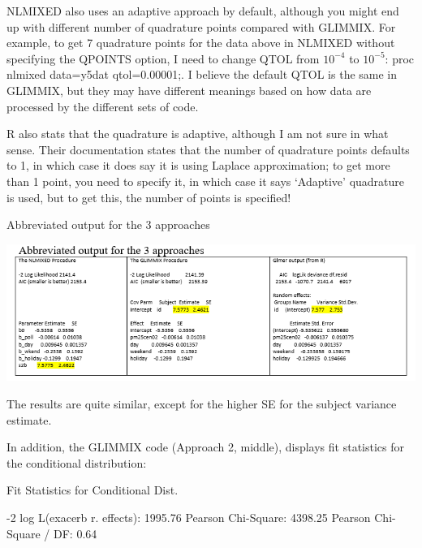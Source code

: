 \documentclass[
  9pt,
  ignorenonframetext,
]{beamer}
\begin{document}
\begin{frame}{}
\protect\hypertarget{section-4}{}
NLMIXED also uses an adaptive approach by default, although you might
end up with different number of quadrature points compared with GLIMMIX.
For example, to get 7 quadrature points for the data above in NLMIXED
without specifying the QPOINTS option, I need to change QTOL from
\(10^{-4}\) to \(10^{-5}\): proc nlmixed data=y5dat qtol=0.00001;. I
believe the default QTOL is the same in GLIMMIX, but they may have
different meanings based on how data are processed by the different sets
of code.

R also stats that the quadrature is adaptive, although I am not sure in
what sense. Their documentation states that the number of quadrature
points defaults to 1, in which case it does say it is using Laplace
approximation; to get more than 1 point, you need to specify it, in
which case it says `Adaptive' quadrature is used, but to get this, the
number of points is specified!
\end{frame}

\begin{frame}{Abbreviated output for the 3 approaches}
\protect\hypertarget{abbreviated-output-for-the-3-approaches}{}
\begin{center}\includegraphics[width=0.7\linewidth]{figs_L15/f2} \end{center}

The results are quite similar, except for the higher SE for the subject
variance estimate.

In addition, the GLIMMIX code (Approach 2, middle), displays fit
statistics for the conditional distribution:

Fit Statistics for Conditional Dist.

-2 log L(exacerb \textbar{} r. effects): 1995.76 Pearson Chi-Square:
4398.25 Pearson Chi-Square / DF: 0.64
\end{frame}
\end{document}
